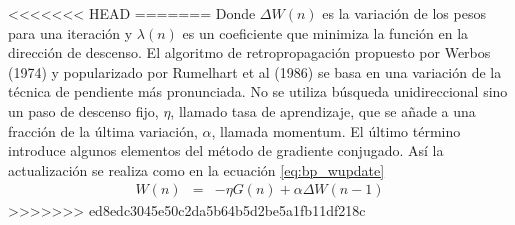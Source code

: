 <<<<<<< HEAD
=======
Donde $\Delta W(n)$ es la variación de los pesos para una iteración y $\lambda(n)$ es un coeficiente que minimiza la función en la dirección de descenso. %
El algoritmo de retropropagación propuesto por Werbos (1974) y popularizado por Rumelhart et al (1986) se basa en una variación de la técnica de pendiente más pronunciada. No se utiliza búsqueda unidireccional sino un paso de descenso fijo, $\eta$, llamado tasa de aprendizaje, que se añade a una fracción de la última variación, $\alpha$, llamada momentum. El último término introduce algunos elementos del método de gradiente conjugado. %
%
Así la actualización se realiza como en la ecuación \ref{eq:bp_wupdate}
\begin{eqnarray}
	W(n) &=& -\eta G(n) + \alpha\Delta W(n - 1)\label{eq:bp_wupdate}
\end{eqnarray}
>>>>>>> ed8edc3045e50c2da5b64b5d2be5a1fb11df218c

